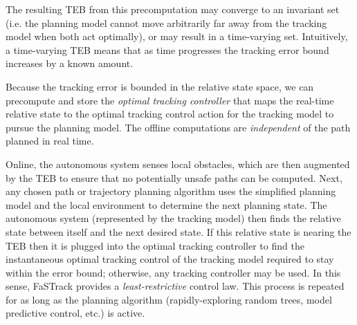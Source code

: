 The resulting TEB from this precomputation may converge to an invariant set (i.e. the planning model cannot move arbitrarily far away from the tracking model when both act optimally), or may result in a time-varying set.
Intuitively, a time-varying TEB means that as time progresses the tracking error bound increases by a known amount.

Because the tracking error is bounded in the relative state space, we can precompute and store the \textit{optimal tracking controller} that maps the real-time relative state to the optimal tracking control action for the tracking model to pursue the planning model. 
The offline computations are \textit{independent} of the path planned in real time.

Online, the autonomous system senses local obstacles, which are then augmented by the TEB to ensure that no potentially unsafe paths can be computed. 
Next, any chosen path or trajectory planning algorithm uses the simplified planning model and the local environment to determine the next planning state. 
The autonomous system (represented by the tracking model) then finds the relative state between itself and the next desired state. 
If this relative state is nearing the TEB then it is plugged into the optimal tracking controller to find the instantaneous optimal tracking control of the tracking model required to stay within the error bound; otherwise, any tracking controller may be used. In this sense, FaSTrack provides a \emph{least-restrictive} control law.
This process is repeated for as long as the planning algorithm (rapidly-exploring random trees, model predictive control, etc.) is active. 



